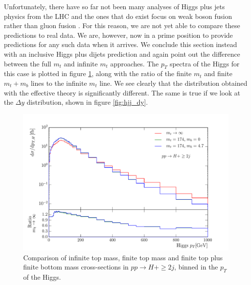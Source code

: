 Unfortunately, there have so far not been many analyses of Higgs plus jets physics from the LHC and the ones that do exist focus on weak boson fusion rather than gluon fusion \cite{ATLAS2016}. For this reason, we are not yet able to compare these predictions to real data. We are, however, now in a prime position to provide predictions for any such data when it arrives. We conclude this section instead with an inclusive Higgs plus dijets prediction and again point out the difference between the full $m_t$ and infinite $m_t$ approaches. The $p_T$ spectra of the Higgs for this case is plotted in figure \ref{fig:hjj_ptH}, along with the ratio of the finite $m_t$ and finite $m_t + m_b$ lines to the infinite $m_t$ line. We see clearly that the distribution obtained with the effective theory is significantly different. The same is true if we look at the $\Delta y$ distribution, shown in figure \ref{fig:hjj_dy}.

\begin{figure}[t]
\centering
\includegraphics[scale=0.64]{Images/Higgs_Plots/pth_compare_all.pdf}
\caption{Comparison of infinite top mass, finite top mass and finite top plus finite bottom mass cross-sections in $pp \to H+\geq2j$, binned in the $p_T$ of the Higgs.}
\label{fig:hjj_ptH}
\end{figure}

